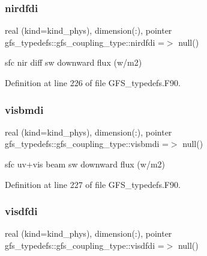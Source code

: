 \mbox{\label{structgfs__typedefs_1_1gfs__coupling__type_a5d9fb206443ea1aacbc769deb868299f}} 
\subsubsection{nirdfdi}
{\footnotesize\ttfamily real (kind=kind\+\_\+phys), dimension(\+:), pointer gfs\+\_\+typedefs\+::gfs\+\_\+coupling\+\_\+type\+::nirdfdi =$>$ null()}



sfc nir diff sw downward flux (w/m2) 



Definition at line 226 of file G\+F\+S\+\_\+typedefs.\+F90.

\mbox{\label{structgfs__typedefs_1_1gfs__coupling__type_a102be5efc900ce83a648693b08169a85}} 
\subsubsection{visbmdi}
{\footnotesize\ttfamily real (kind=kind\+\_\+phys), dimension(\+:), pointer gfs\+\_\+typedefs\+::gfs\+\_\+coupling\+\_\+type\+::visbmdi =$>$ null()}



sfc uv+vis beam sw downward flux (w/m2) 



Definition at line 227 of file G\+F\+S\+\_\+typedefs.\+F90.

\mbox{\label{structgfs__typedefs_1_1gfs__coupling__type_a69f7a6ab15cb856634488ed0aa494007}} 
\subsubsection{visdfdi}
{\footnotesize\ttfamily real (kind=kind\+\_\+phys), dimension(\+:), pointer gfs\+\_\+typedefs\+::gfs\+\_\+coupling\+\_\+type\+::visdfdi =$>$ null()}



